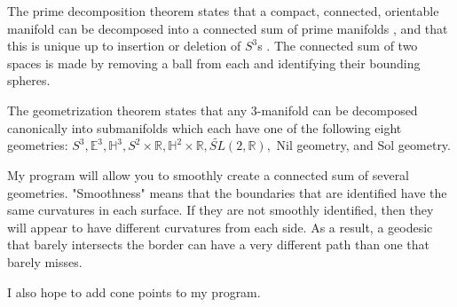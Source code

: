 \documentclass[12pt]{amsart}
\newcommand{\ignore}[1]{}
\begin{document}
\ignore{1.  Describe 3-manifold decompositions.
  A.  Prime decomposition theorem -- see Allen Hatcher's notes for statement and references.

}
\ignore{@Misc{•,
OPTkey = {•},
OPTauthor = {Allen Hatcher},
OPTtitle = {Notes on Basic 3-Manifold Topology},
OPThowpublished = {•},
OPTmonth = {•},
OPTyear = {•},
OPTnote = {•},
OPTannote = {•}
}}

The prime decomposition theorem states that a compact, connected, orientable manifold can be decomposed into a connected sum of prime manifolds \cite{Kneser}, and that this is unique up to insertion or deletion of $S^3$s \cite{Milnor}. The connected sum of two spaces is made by removing a ball from each and identifying their bounding spheres.
  
  

The geometrization theorem states that any 3-manifold can be decomposed canonically into submanifolds which each have one of the following eight geometries: $S^3, \mathbb{E}^3, \mathbb{H}^3, S^2 \times \mathbb{R}, \mathbb{H}^2 \times \mathbb{R}, \tilde{SL}(2,\mathbb{R}),$ Nil geometry, and Sol geometry.



My program will allow you to smoothly create a connected sum of several geometries. "Smoothness" means that the boundaries that are identified have the same curvatures in each surface. If they are not smoothly identified, then they will appear to have different curvatures from each side. As a result, a geodesic that barely intersects the border can have a very different path than one that barely misses.


I also hope to add cone points to my program.
\end{document}
